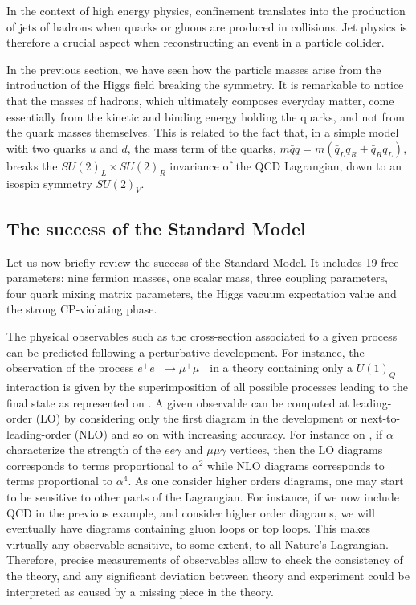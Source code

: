     In the context of high energy physics, confinement translates into the production of
    jets of hadrons when quarks or gluons are produced in collisions. Jet physics is
    therefore a crucial aspect when reconstructing an event in a particle collider.

    In the previous section, we have seen how the particle masses arise from the
    introduction of the Higgs field breaking the symmetry. It is remarkable to notice
    that the masses of hadrons, which ultimately composes everyday matter, come essentially
    from the kinetic and binding energy holding the quarks, and not from the quark masses
    themselves. This is related to the fact that, in a simple model with two quarks $u$ and
    $d$, the mass term of the quarks, $m\bar{q}q = m(\bar{q}_L q_R + \bar{q}_R q_L)$, breaks
    the $SU(2)_L \times SU(2)_R$ invariance of the QCD Lagrangian, down to an isospin symmetry
    $SU(2)_V$.

    \subsection{The success of the Standard Model \label{sec:standardModelSuccess}}

    Let us now briefly review the success of the Standard Model. It includes 19 free
    parameters: nine fermion masses, one scalar mass, three coupling parameters, four quark
    mixing matrix parameters, the Higgs vacuum expectation value and the strong CP-violating
    phase.

    The physical observables such as the cross-section associated to a given process
    can be predicted following a perturbative development. For instance, the observation
    of the process $e^+ e^- \rightarrow \mu^+ \mu^-$ in a theory containing only a $U(1)_Q$
    interaction is given by the superimposition of all possible processes leading to the
    final state as represented on
    . A given observable can be computed at leading-order
    (LO) by considering only the first diagram in the development or next-to-leading-order (NLO)
    and so on with increasing accuracy. For instance on ,
    if $\alpha$ characterize the strength of the $ee\gamma$ and $\mu\mu\gamma$ vertices, then
    the LO diagrams corresponds to terms proportional to $\alpha^2$ while NLO diagrams
    corresponds to terms proportional to $\alpha^4$. As one consider higher orders diagrams,
    one may start
    to be sensitive to other parts of the Lagrangian. For instance, if we now include QCD in
    the previous example, and consider higher order diagrams, we will eventually have diagrams
    containing gluon loops or top loops. This makes virtually any observable sensitive,
    to some extent, to all Nature's Lagrangian. Therefore, precise measurements of observables
    allow to check the consistency of the theory, and any significant deviation between
    theory and experiment could be interpreted as caused by a missing piece in the theory.

